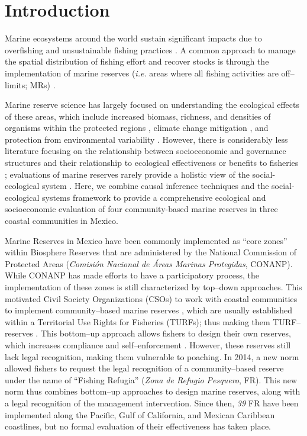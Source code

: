 \documentclass{frontiersSCNS}
\theoremstyle{definition}
\theoremstyle{definition}
\theoremstyle{definition}
\theoremstyle{remark}
\begin{document}
\clearpage

\section{Introduction}\label{introduction}

Marine ecosystems around the world sustain significant impacts due to
overfishing and unsustainable fishing practices
\citep{halpern_2008-dK,worm_2006-IB,pauly_2005-qV}. A common approach to
manage the spatial distribution of fishing effort and recover stocks is
through the implementation of marine reserves (\emph{i.e.} areas where
all fishing activities are off--limits; MRs)
\citep{afflerbach_2014-HP,krueck_2017-J1,sala_2017-69}.

Marine reserve science has largely focused on understanding the
ecological effects of these areas, which include increased biomass,
richness, and densities of organisms within the protected regions
\citep{lester_2009-Ks,giakoumi_2017-V2,sala_2017-69}, climate change
mitigation \citep{roberts_2017-J9}, and protection from environmental
variability \citep{micheli_2012-EU}. However, there is considerably less
literature focusing on the relationship between socioeconomic and
governance structures and their relationship to ecological effectiveness
\citep{halpern_2013,lpezangarita_2014,mascia_2017-m_} or benefits to
fisheries \citep{krueck_2017-J1}; evaluations of marine reserves rarely
provide a holistic view of the social-ecological system
\citep{lpezangarita_2014}. Here, we combine causal inference techniques
\citep{depalma_2018} and the social-ecological systems framework
\citep{ostrom_2009-hg} to provide a comprehensive ecological and
socioeconomic evaluation of four community-based marine reserves in
three coastal communities in Mexico.

Marine Reserves in Mexico have been commonly implemented as ``core
zones'' within Biosphere Reserves that are administered by the National
Commission of Protected Areas (\emph{Comisión Nacional de Áreas Marinas
Protegidas}, CONANP). While CONANP has made efforts to have a
participatory process, the implementation of these zones is still
characterized by top--down approaches. This motivated Civil Society
Organizations (CSOs) to work with coastal communities to implement
community--based marine reserves \citep{uribe_2010-u2}, which are
usually established within a Territorial Use Rights for Fisheries
(TURFs); thus making them TURF--reserves \citep{afflerbach_2014-HP}.
This bottom--up approach allows fishers to design their own reserves,
which increases compliance and self--enforcement
\citep{gelcich_2015-Gw,espinosaromero_2014-PY,beger_2004-Y8}. However,
these reserves still lack legal recognition, making them vulnerable to
poaching. In 2014, a new norm \citep{nom} allowed fishers to request the
legal recognition of a community--based reserve under the name of
``Fishing Refugia'' (\emph{Zona de Refugio Pesquero}, FR). This new norm
thus combines bottom--up approaches to design marine reserves, along
with a legal recognition of the management intervention. Since then,
\emph{39} FR have been implemented along the Pacific, Gulf of
California, and Mexican Caribbean coastlines, but no formal evaluation
of their effectiveness has taken place.
\end{document}
